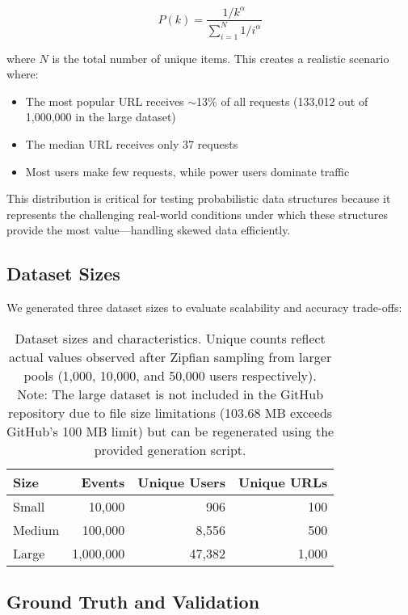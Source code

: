 \begin{equation}
    P(k) = \frac{1/k^{\alpha}}{\sum_{i=1}^{N} 1/i^{\alpha}}
\end{equation}

where $N$ is the total number of unique items. This creates a realistic scenario where:

\begin{itemize}
    \item The most popular URL receives $\sim$13\% of all requests (133,012 out of 1,000,000 in the large dataset)
    \item The median URL receives only 37 requests
    \item Most users make few requests, while power users dominate traffic
\end{itemize}

This distribution is critical for testing probabilistic data structures because it represents the challenging real-world conditions under which these structures provide the most value---handling skewed data efficiently.

\subsection{Dataset Sizes}

We generated three dataset sizes to evaluate scalability and accuracy trade-offs:

\begin{table}[h]
\centering
\begin{tabular}{@{}lrrr@{}}
\toprule
\textbf{Size} & \textbf{Events} & \textbf{Unique Users} & \textbf{Unique URLs} \\
\midrule
Small  & 10,000     & 906       & 100  \\
Medium & 100,000    & 8,556     & 500  \\
Large  & 1,000,000  & 47,382    & 1,000 \\
\bottomrule
\end{tabular}
\caption{Dataset sizes and characteristics. Unique counts reflect actual values observed after Zipfian sampling from larger pools (1,000, 10,000, and 50,000 users respectively). Note: The large dataset is not included in the GitHub repository due to file size limitations (103.68 MB exceeds GitHub's 100 MB limit) but can be regenerated using the provided generation script.}
\label{tab:dataset_sizes}
\end{table}

\subsection{Ground Truth and Validation}

